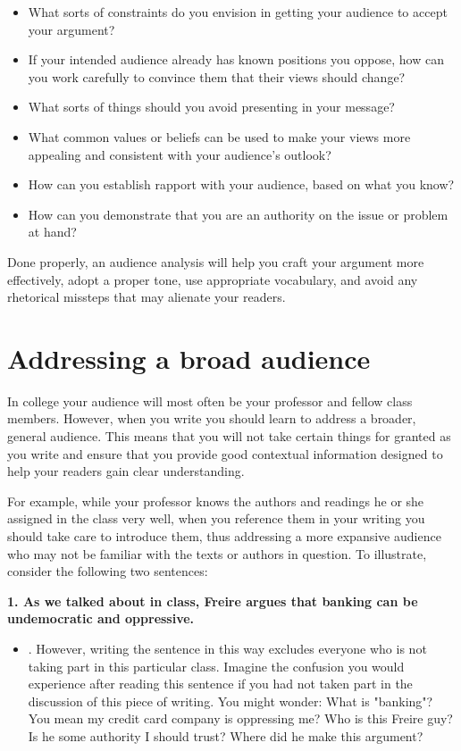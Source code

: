 \begin{itemize}

\item What sorts of constraints do you envision in getting your audience to accept your
argument? 
\item If your intended audience already has known positions you
oppose, how can you work carefully to convince them that their views should
change? 
\item What sorts of things should you avoid presenting in your message?
\item What common values or beliefs can be used to make your views more
appealing and consistent with your audience's outlook? 
\item How can you establish rapport with your audience, based on what you know? 
\item How can you demonstrate that you are an authority on the issue or problem at hand?

\end{itemize}

\noindent Done properly, an audience analysis will help you craft your argument
more effectively, adopt a proper tone, use appropriate vocabulary, and avoid
any rhetorical missteps that may alienate your readers.

 \section{Addressing a broad audience}

In college your audience will most often be your professor and fellow class
members. However, when you write you should learn to address a broader, general audience.
This means that you will not take certain things for granted as you write and ensure
that you provide good contextual information designed to help your readers gain clear understanding. 

For example, while your professor knows the authors and readings he or she assigned in the class
very well, when you reference them in your writing you should take care to
introduce them, thus addressing a more expansive audience who may not
be familiar with the texts or authors in question. To illustrate, consider the following two
sentences:

\newpage

\textbf{1. As we talked about in class, Freire argues that banking can be undemocratic and oppressive.}

\begin{itemize} \item {}. However,
writing the sentence in this way excludes everyone who is not taking part in
this particular class. Imagine the confusion you would experience after reading
this sentence if you had not taken part in the discussion of this piece of
writing. You might wonder: What is "banking"? You mean my credit card company is oppressing me? Who is this Freire guy? Is he some authority I should trust? Where did he make this argument?
\end{itemize}

